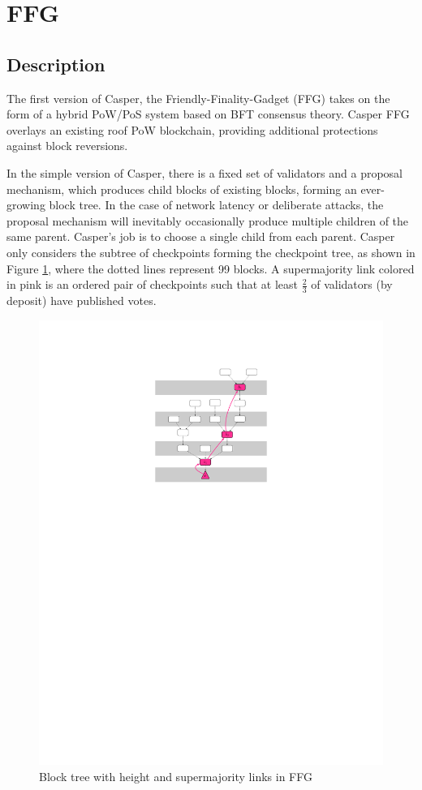 \documentclass[lang=en]{sjtuarticle}
\begin{document}
\section{FFG}

\subsection{Description}

The first version of Casper, the Friendly-Finality-Gadget (FFG) \cite{ffg} takes on the form of a hybrid PoW/PoS system based on BFT consensus theory. Casper FFG overlays an existing roof PoW blockchain, providing additional protections against block reversions.

In the simple version of Casper, there is a fixed set of validators and a proposal mechanism, which produces child blocks of existing blocks, forming an
ever-growing block tree. In the case of network
latency or deliberate attacks, the proposal mechanism will inevitably occasionally produce multiple children of
the same parent. Casper's job is to choose a single child from each parent. Casper only considers the subtree of checkpoints
forming the checkpoint tree, as shown in Figure \ref{fig:ffg}, where the dotted lines represent 99 blocks. A supermajority link colored in pink is an ordered pair of checkpoints such that at least $\frac{2}{3}$ of
validators (by deposit) have published votes.

\begin{figure}[h]
    \centering
    \includegraphics{FFG.pdf}
    \caption{Block tree with height and supermajority links in FFG}
    \label{fig:ffg}
\end{figure}
\end{document}
